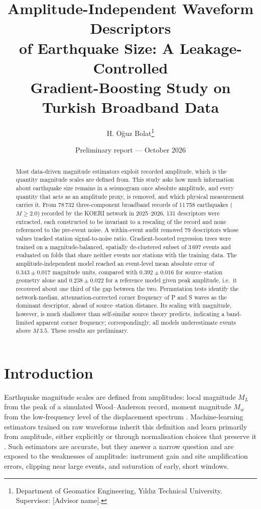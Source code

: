 \documentclass[11pt,a4paper]{article}
\title{Amplitude-Independent Waveform Descriptors\\ of Earthquake Size:
A Leakage-Controlled\\ Gradient-Boosting Study on Turkish Broadband Data}
\author{H. Oğuz Bolat\thanks{Department of Geomatics Engineering, Yıldız Technical University. Supervisor: [Advisor name].}}
\date{Preliminary report --- October 2026}
\begin{document}
\maketitle

\begin{abstract}
  \noindent
  Most data-driven magnitude estimators exploit recorded amplitude, which is the
  quantity magnitude scales are defined from. This study asks how much
  information about earthquake size remains in a seismogram once absolute
  amplitude, and every quantity that acts as an amplitude proxy, is removed, and
  which physical measurement carries it. From 78\,732 three-component
  broadband records of 11\,758 earthquakes ($M \geq 2.0$) recorded by the KOERI
  network in 2025--2026, 131 descriptors were extracted, each constructed to be
  invariant to a rescaling of the record and none referenced to the pre-event
  noise. A within-event audit removed 79 descriptors whose values tracked
  station signal-to-noise ratio. Gradient-boosted regression trees were trained
  on a magnitude-balanced, spatially de-clustered subset of 3\,697 events and
  evaluated on folds that share neither events nor stations with the training
  data. The amplitude-independent model reached an event-level mean absolute
  error of $0.343 \pm 0.017$ magnitude units, compared with $0.392 \pm 0.016$ for
  source--station geometry alone and $0.238 \pm 0.022$ for a reference model given
  peak amplitude, i.e.\ it recovered about one third of the gap between the two.
  Permutation tests identify the network-median, attenuation-corrected
  corner frequency of P and S waves as the dominant descriptor, ahead of
  source--station distance. Its scaling with magnitude, however, is
  much shallower than self-similar source theory predicts, indicating a
  band-limited apparent corner frequency; correspondingly, all models
  underestimate events above $M\,3.5$. These results are preliminary.
\end{abstract}

\section{Introduction}

Earthquake magnitude scales are defined from amplitudes: local magnitude
$M_L$ from the peak of a simulated Wood--Anderson record, moment magnitude
$M_w$ from the low-frequency level of the displacement spectrum
\citep{hanks1979}. Machine-learning estimators trained on raw waveforms
inherit this definition and learn primarily from amplitude, either
explicitly or through normalisation choices that preserve it
\citep{mousavi2020,mousavi2023}. Such estimators are accurate, but they
answer a narrow question and are exposed to the weaknesses of amplitude:
instrument gain and site amplification errors, clipping near large events,
and saturation of early, short windows.
\end{document}
